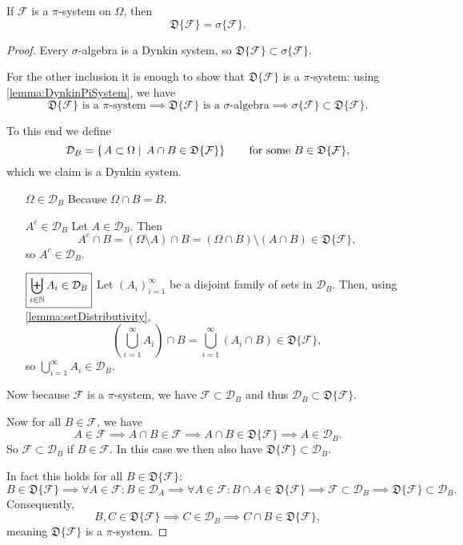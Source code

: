 \begin{proposition} \label{prop:generatedDynkinSigma}
If $\mathcal{F}$ is a $\pi$-system on $\Omega$, then
\[ \mathfrak{D}\{\mathcal{F}\} = \sigma\{\mathcal{F}\}. \]
\end{proposition}
\begin{proof}
Every $\sigma$-algebra is a Dynkin system, so $\mathfrak{D}\{\mathcal{F}\} \subset \sigma\{\mathcal{F}\}$.

For the other inclusion it is enough to show that $\mathfrak{D}\{\mathcal{F}\}$ is a $\pi$-system: using \ref{lemma:DynkinPiSystem}, we have
\[ \text{$\mathfrak{D}\{\mathcal{F}\}$ is a $\pi$-system} \implies \text{$\mathfrak{D}\{\mathcal{F}\}$ is a $\sigma$-algebra} \implies \sigma\{\mathcal{F}\}\subset\mathfrak{D}\{\mathcal{F}\}. \]

To this end we define
\[ \mathcal{D}_B = \left\{\left. A\subset\Omega \;\right|\; A\cap B\in\mathfrak{D}\{\mathcal{F}\} \right\} \qquad \text{for some $B\in\mathfrak{D}\{\mathcal{F}\}$,} \]
which we claim is a Dynkin system.
\begin{itemize}[leftmargin=2.5cm]
\item[$\boxed{\Omega\in\mathcal{D}_B}$] Because $\Omega\cap B = B$.
\item[$\boxed{A^c\in\mathcal{D}_B}$] Let $A\in\mathcal{D}_B$. Then
\[ A^c\cap B = (\Omega\setminus A)\cap B = (\Omega\cap B)\setminus(A\cap B) \in \mathfrak{D}\{\mathcal{F}\}, \]
so $A^c\in\mathcal{D}_B$.
\item[$\boxed{\biguplus_{i\in \mathbb{N}}A_i \in \mathcal{D}_B}$] Let $(A_i)_{i=1}^\infty$ be a disjoint family of sets in $\mathcal{D}_B$. Then, using \ref{lemma:setDistributivity},
\[ \left(\bigcup_{i=1}^\infty A_i\right)\cap B = \bigcup_{i=1}^\infty (A_i\cap B) \in \mathfrak{D}\{\mathcal{F}\}, \]
so $\bigcup_{i=1}^\infty A_i\in\mathcal{D}_B$.
\end{itemize}
Now because $\mathcal{F}$ is a $\pi$-system, we have $\mathcal{F}\subset\mathcal{D}_B$ and thus $\mathcal{D}_B\subset\mathfrak{D}\{\mathcal{F}\}$.

Now for all $B\in\mathcal{F}$, we have
\[ A\in\mathcal{F}\implies A\cap B\in\mathcal{F}\implies A\cap B\in\mathfrak{D}\{\mathcal{F}\} \implies A\in \mathcal{D}_B. \]
So $\mathcal{F}\subset \mathcal{D}_B$ if $B\in\mathcal{F}$. In this case we then also have $\mathfrak{D}\{\mathcal{F}\}\subset \mathcal{D}_B$.

In fact this holds for all $B\in\mathfrak{D}\{\mathcal{F}\}$:
\[ B\in\mathfrak{D}\{\mathcal{F}\} \implies \forall A\in\mathcal{F}: B\in\mathcal{D}_A \implies  \forall A\in\mathcal{F}: B\cap A \in \mathfrak{D}\{\mathcal{F}\} \implies \mathcal{F}\subset\mathcal{D}_B \implies \mathfrak{D}\{\mathcal{F}\}\subset \mathcal{D}_B. \]
Consequently,
\[ B,C\in\mathfrak{D}\{\mathcal{F}\} \implies C\in\mathcal{D}_B \implies C\cap B\in\mathfrak{D}\{\mathcal{F}\}, \]
meaning $\mathfrak{D}\{\mathcal{F}\}$ is a $\pi$-system.
\end{proof}
